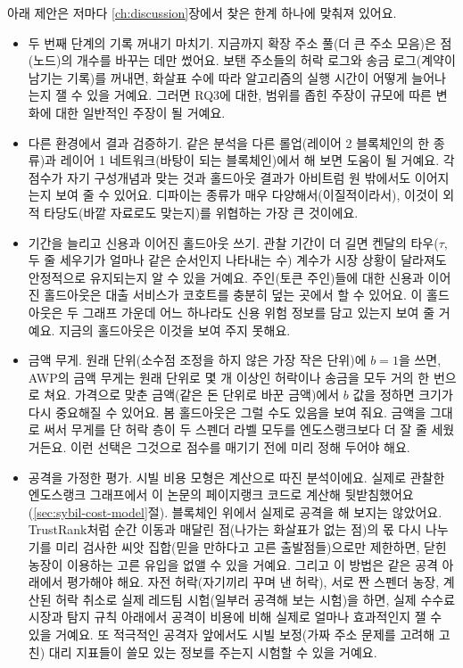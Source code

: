 
아래 제안은 저마다 \ref{ch:discussion}장에서 찾은 한계 하나에 맞춰져 있어요.

\begin{itemize}
\item 두 번째 단계의 기록 꺼내기 마치기. 지금까지 확장 주소 풀(더 큰 주소 모음)은 점(노드)의 개수를 바꾸는 데만 썼어요. 보탠 주소들의 허락 로그와 송금 로그(계약이 남기는 기록)를 꺼내면, 화살표 수에 따라 알고리즘의 실행 시간이 어떻게 늘어나는지 잴 수 있을 거예요. 그러면 RQ3에 대한, 범위를 좁힌 주장이 규모에 따른 변화에 대한 일반적인 주장이 될 거예요.
\item 다른 환경에서 결과 검증하기. 같은 분석을 다른 롤업(레이어 2 블록체인의 한 종류)과 레이어 1 네트워크(바탕이 되는 블록체인)에서 해 보면 도움이 될 거예요. 각 점수가 자기 구성개념과 맞는 것과 홀드아웃 결과가 아비트럼 원 밖에서도 이어지는지 보여 줄 수 있어요. 디파이는 종류가 매우 다양해서(이질적이라서), 이것이 외적 타당도(바깥 자료로도 맞는지)를 위협하는 가장 큰 것이에요.
\item 기간을 늘리고 신용과 이어진 홀드아웃 쓰기. 관찰 기간이 더 길면 켄달의 타우($\tau$, 두 줄 세우기가 얼마나 같은 순서인지 나타내는 수) 계수가 시장 상황이 달라져도 안정적으로 유지되는지 알 수 있을 거예요. 주인(토큰 주인)들에 대한 신용과 이어진 홀드아웃은 대출 서비스가 코호트를 충분히 덮는 곳에서 할 수 있어요. 이 홀드아웃은 두 그래프 가운데 어느 하나라도 신용 위험 정보를 담고 있는지 보여 줄 거예요. 지금의 홀드아웃은 이것을 보여 주지 못해요.
\item 금액 무게. 원래 단위(소수점 조정을 하지 않은 가장 작은 단위)에 $b=1$을 쓰면, AWP의 금액 무게는 원래 단위로 몇 개 이상인 허락이나 송금을 모두 거의 한 번으로 쳐요. 가격으로 맞춘 금액(같은 돈 단위로 바꾼 금액)에서 $b$ 값을 정하면 크기가 다시 중요해질 수 있어요. 봄 홀드아웃은 그럴 수도 있음을 보여 줘요. 금액을 그대로 써서 무게를 단 허락 층이 두 스펜더 라벨 모두를 엔도스랭크보다 더 잘 줄 세웠거든요. 이런 선택은 그것으로 점수를 매기기 전에 미리 정해 두어야 해요.
\item 공격을 가정한 평가. 시빌 비용 모형은 계산으로 따진 분석이에요. 실제로 관찰한 엔도스랭크 그래프에서 이 논문의 페이지랭크 코드로 계산해 뒷받침했어요(\ref{sec:sybil-cost-model}절). 블록체인 위에서 실제로 공격을 해 보지는 않았어요. TrustRank처럼 순간 이동과 매달린 점(나가는 화살표가 없는 점)의 몫 다시 나누기를 미리 검사한 씨앗 집합(믿을 만하다고 고른 출발점들)으로만 제한하면, 닫힌 농장이 이용하는 고른 유입을 없앨 수 있을 거예요. 그리고 이 방법은 같은 공격 아래에서 평가해야 해요. 자전 허락(자기끼리 꾸며 낸 허락), 서로 짠 스펜더 농장, 계산된 허락 취소로 실제 레드팀 시험(일부러 공격해 보는 시험)을 하면, 실제 수수료 시장과 탐지 규칙 아래에서 공격이 비용에 비해 실제로 얼마나 효과적인지 잴 수 있을 거예요. 또 적극적인 공격자 앞에서도 시빌 보정(가짜 주소 문제를 고려해 고친) 대리 지표들이 쓸모 있는 정보를 주는지 시험할 수 있을 거예요.

\end{itemize}

